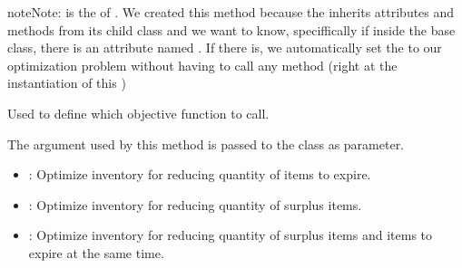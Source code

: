 \documentclass[letterpaper,10pt,english]{sphinxmanual}
\begin{document}
\begin{fulllineitems}
\begin{fulllineitems}
\begin{sphinxadmonition}{note}{Note:}
{\hyperref[\detokenize{source/optimization.model:optimization.model.optimizer.ObjectiveFunction}]{}} is the  of         {\hyperref[\detokenize{source/optimization.model:optimization.model.optimizer.OptimizationModel}]{}}. We created this method because         the  inherits attributes and methods from its child class and we want to know, speciffically         if inside the base class, there is an attribute named . If there is, we automatically set         the  to our optimization problem without having to call any method         (right at the instantiation of this )
\end{sphinxadmonition}

\end{fulllineitems}


\begin{fulllineitems}
\label{\detokenize{source/optimization.model:optimization.model.optimizer.ObjectiveFunction.set_objective}}
Used to define which objective function to call.

The argument used by this method is passed to the class  as parameter.

\begin{itemize}
\item {} 
: Optimize inventory for reducing  quantity of items to expire.

\item {} 
: Optimize inventory for reducing  quantity of surplus items.

\item {} 
: Optimize inventory for reducing  quantity of surplus items and items to expire at the same time.


\end{itemize}
\end{fulllineitems}
\end{fulllineitems}
\end{document}
